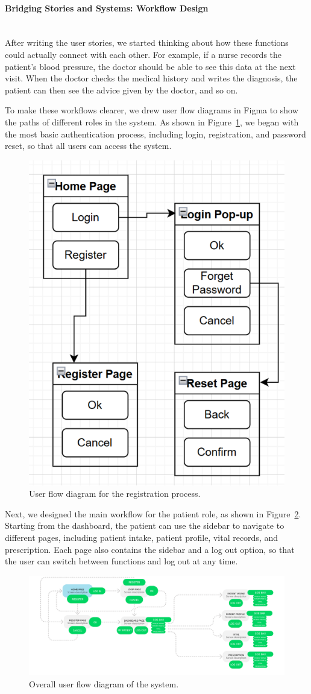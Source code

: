 \paragraph{Bridging Stories and Systems: Workflow Design}\mbox{}\\

After writing the user stories, we started thinking about how these functions could actually connect with each other. For example, if a nurse records the patient’s blood pressure, the doctor should be able to see this data at the next visit. When the doctor checks the medical history and writes the diagnosis, the patient can then see the advice given by the doctor, and so on.

To make these workflows clearer, we drew user flow diagrams in Figma to show the paths of different roles in the system. As shown in Figure~\ref{fig:userflow-registration}, we began with the most basic authentication process, including login, registration, and password reset, so that all users can access the system.

\begin{figure}[H]
   \centering
   \includegraphics[width=0.4\linewidth]{../../images/userflow_registration.png}
   \caption{User flow diagram for the registration process.}
   \label{fig:userflow-registration}
\end{figure}

Next, we designed the main workflow for the patient role, as shown in Figure~\ref{fig:userflow-whole}. Starting from the dashboard, the patient can use the sidebar to navigate to different pages, including patient intake, patient profile, vital records, and prescription. Each page also contains the sidebar and a log out option, so that the user can switch between functions and log out at any time.
\begin{figure}[H]
   \centering
   \includegraphics[width=1.1\linewidth]{../../images/userflow_whole.png}
   \caption{Overall user flow diagram of the system.}
   \label{fig:userflow-whole}
\end{figure}


